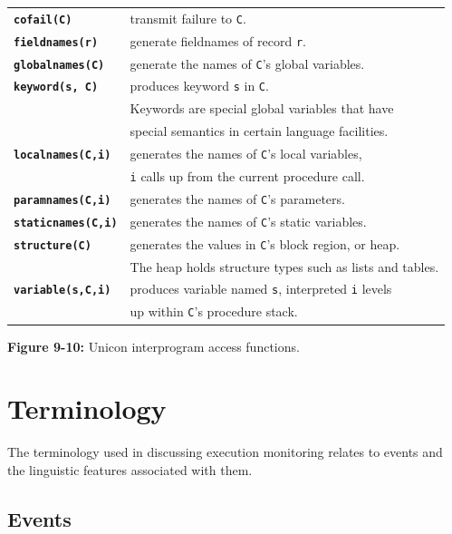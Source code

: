 \begin{center}

\begin{tabular}{|ll|} \hline
{\bf\tt cofail(C)}      & transmit failure to {\tt C}. \\
{\bf\tt fieldnames(r)}  & generate fieldnames of record {\tt r}. \\
{\bf\tt globalnames(C)} & generate the names of {\tt C}'s global
variables. \\
{\bf\tt keyword(s, C)} & produces keyword {\tt s} in {\tt C}. \\
	& Keywords are special global variables that have \\
	& special semantics in certain language facilities.\\
{\bf\tt localnames(C,i)} & generates the names of {\tt C}'s local variables,\\
	& {\tt i} calls up from the current procedure call. \\
{\bf\tt paramnames(C,i)} & generates the names of {\tt C}'s parameters. \\
{\bf\tt staticnames(C,i)} & generates the names of {\tt C}'s static variables. \\
{\bf\tt structure(C)} & generates the values in {\tt C}'s block
region, or heap. \\
	 & The heap holds structure types such as lists and tables. \\
{\bf\tt variable(s,C,i)} & produces variable named {\tt s}, interpreted {\tt i} levels\\
	& up within {\tt C}'s procedure stack. \\
\hline
\end{tabular}
\end{center}
\medskip

{\sffamily\bfseries Figure 9-10:}
{\sffamily Unicon interprogram access functions.}

\bigskip


\section{Terminology}

The terminology used in discussing execution monitoring relates to
events and the linguistic features associated with them.

\subsection*{Events}


